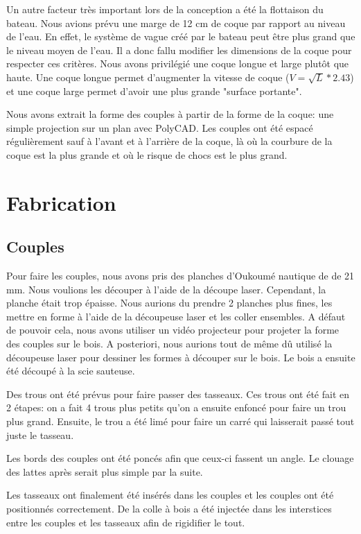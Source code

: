 \documentclass[a4paper, 11pt]{report}
\begin{document}
Un autre facteur très important lors de la conception a été la flottaison du bateau. Nous avions prévu une marge de 12 cm de coque par rapport au niveau de l'eau. En effet, le système de vague créé par le bateau peut être plus grand que le niveau moyen de l'eau. Il a donc fallu modifier les dimensions de la coque pour respecter ces critères. Nous avons privilégié une coque longue et large plutôt que haute. Une coque longue permet d'augmenter la vitesse de coque ($V = \sqrt{L}*2.43$) et une coque large permet d'avoir une plus grande "surface portante".

Nous avons extrait la forme des couples à partir de la forme de la coque: une simple projection sur un plan avec PolyCAD. Les couples ont été espacé régulièrement sauf à l'avant et à l'arrière de la coque, là où la courbure de la coque est la plus grande et où le risque de chocs est le plus grand.

\section{Fabrication}

\subsection{Couples}
Pour faire les couples, nous avons pris des planches d'Oukoumé nautique de de 21 mm. Nous voulions les découper à l'aide de la découpe laser. Cependant, la planche était trop épaisse. Nous aurions du prendre 2 planches plus fines, les mettre en forme à l'aide de la découpeuse laser et les coller ensembles. A défaut de pouvoir cela, nous avons utiliser un vidéo projecteur pour projeter la forme des couples sur le bois. A posteriori, nous aurions tout de même dû utilisé la découpeuse laser pour dessiner les formes à découper sur le bois. Le bois a ensuite été découpé à la scie sauteuse.

Des trous ont été prévus pour faire passer des tasseaux. Ces trous ont été fait en 2 étapes: on a fait 4 trous plus petits qu'on a ensuite enfoncé pour faire un trou plus grand. Ensuite, le trou a été limé pour faire un carré qui laisserait passé tout juste le tasseau.

Les bords des couples ont été poncés afin que ceux-ci fassent un angle. Le clouage des lattes après serait plus simple par la suite.

Les tasseaux ont finalement été insérés dans les couples et les couples ont été positionnés correctement. De la colle à bois a été injectée dans les interstices entre les couples et les tasseaux afin de rigidifier le tout.
\end{document}
